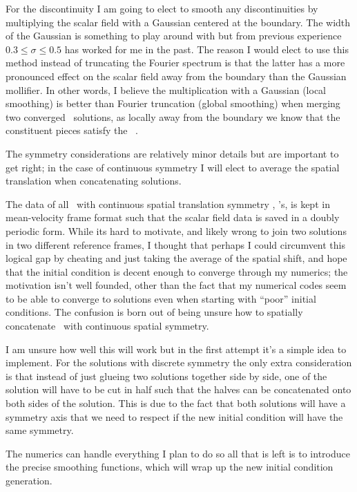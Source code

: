 \begin{description}
{\begin{description}
For the discontinuity I am going
to elect to smooth any discontinuities by multiplying the scalar field with a Gaussian centered at the boundary. The width
of the Gaussian is something to play around with but from previous experience $0.3 \leq \sigma \leq 0.5$ has worked for me in the
past. The reason I would elect to use this method instead of truncating the Fourier spectrum is that the latter has a more
pronounced effect on the scalar field away from the boundary than the Gaussian mollifier. In other words, I believe the multiplication
with a Gaussian (local smoothing) is better than Fourier truncation (global smoothing) when merging two converged \twot\ solutions, as
locally away from the boundary we know that the constituent pieces satisfy the \KSe\ .

The symmetry considerations are relatively minor details but are important to
get right; in the case of continuous symmetry I will elect to average the
spatial translation when concatenating solutions.

    The data of all \twots\ with continuous spatial translation symmetry \ie,
    \rpo's, is kept in mean-velocity frame format such that the scalar field
    data is saved in a doubly periodic form. While its hard to
    motivate, and likely wrong to join two solutions in two different
    reference frames, I thought that perhaps I could circumvent this logical
    gap by cheating and just taking the average of the spatial shift, and
    hope that the initial condition is decent enough to converge through my
    numerics; the motivation isn't well founded, other than the fact that my
    numerical codes seem to be able to converge to solutions even when
    starting with ``poor'' initial conditions. The confusion is born out of
    being unsure how to spatially concatenate \twots\ with continuous spatial
    symmetry.

I am unsure how well this will work but in the first attempt it's a simple
idea to implement. For the solutions with discrete symmetry the only extra consideration is that instead of just glueing two solutions together side by
side, one of the solution will have to be cut in half such that the halves can be concatenated onto both sides of the solution. This is due to the
fact that both solutions will have a symmetry axis that we need to respect if the new initial condition will have the same symmetry.

The numerics can handle everything I plan to do so all that is left is to introduce the precise smoothing functions, which will
wrap up the new initial condition generation.


\end{description}}
\end{description}

